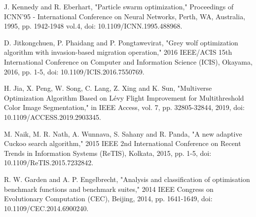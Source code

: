\documentclass[conference]{IEEEtran}
\begin{document}
\begin{thebibliography}{00}
 J. Kennedy and R. Eberhart, "Particle swarm optimization," Proceedings of ICNN'95 - International Conference on Neural Networks, Perth, WA, Australia, 1995, pp. 1942-1948 vol.4, doi: 10.1109/ICNN.1995.488968.

 D. Jitkongchuen, P. Phaidang and P. Pongtawevirat, "Grey wolf optimization algorithm with invasion-based migration operation," 2016 IEEE/ACIS 15th International Conference on Computer and Information Science (ICIS), Okayama, 2016, pp. 1-5, doi: 10.1109/ICIS.2016.7550769.

 H. Jia, X. Peng, W. Song, C. Lang, Z. Xing and K. Sun, "Multiverse Optimization Algorithm Based on Lévy Flight Improvement for Multithreshold Color Image Segmentation," in IEEE Access, vol. 7, pp. 32805-32844, 2019, doi: 10.1109/ACCESS.2019.2903345.

 M. Naik, M. R. Nath, A. Wunnava, S. Sahany and R. Panda, "A new adaptive Cuckoo search algorithm," 2015 IEEE 2nd International Conference on Recent Trends in Information Systems (ReTIS), Kolkata, 2015, pp. 1-5, doi: 10.1109/ReTIS.2015.7232842.

 R. W. Garden and A. P. Engelbrecht, "Analysis and classification of optimisation benchmark functions and benchmark suites," 2014 IEEE Congress on Evolutionary Computation (CEC), Beijing, 2014, pp. 1641-1649, doi: 10.1109/CEC.2014.6900240.

\end{thebibliography}


\end{document}

